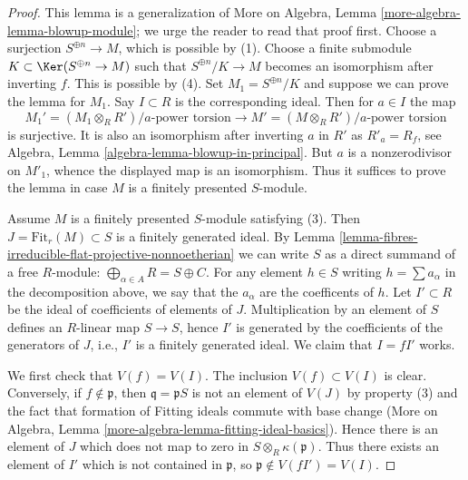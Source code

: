 \begin{proof}
This lemma is a generalization of
More on Algebra, Lemma \ref{more-algebra-lemma-blowup-module};
we urge the reader to read that proof first.
Choose a surjection $S^{\oplus n} \to M$, which is possible by (1).
Choose a finite submodule $K \subset \Ker(S^{\oplus n} \to M)$
such that $S^{\oplus n}/K \to M$ becomes an isomorphism after inverting $f$.
This is possible by (4). Set $M_1 = S^{\oplus n}/K$ and suppose we can
prove the lemma for $M_1$. Say $I \subset R$ is the corresponding ideal.
Then for $a \in I$ the map
$$
M_1' = (M_1 \otimes_R R')/a\text{-power torsion}
\longrightarrow
M' = (M \otimes_R R')/a\text{-power torsion}
$$
is surjective. It is also an isomorphism after inverting $a$ in $R'$
as $R'_a = R_f$, see Algebra, Lemma \ref{algebra-lemma-blowup-in-principal}.
But $a$ is a nonzerodivisor on $M'_1$, whence the displayed map is an
isomorphism. Thus it suffices to prove the lemma in case $M$ is a finitely
presented $S$-module.

\medskip\noindent
Assume $M$ is a finitely presented $S$-module satisfying (3).
Then $J = \text{Fit}_r(M) \subset S$ is a finitely generated ideal.
By Lemma \ref{lemma-fibres-irreducible-flat-projective-nonnoetherian}
we can write $S$ as a direct summand of a free
$R$-module: $\bigoplus_{\alpha \in A} R = S \oplus C$.
For any element $h \in S$ writing $h = \sum a_\alpha$ in the
decomposition above, we say that the $a_\alpha$ are the coefficents of $h$.
Let $I' \subset R$ be the ideal of coefficients
of elements of $J$. Multiplication by an element of $S$ defines
an $R$-linear map $S \to S$, hence $I'$ is generated by the coefficients
of the generators of $J$, i.e., $I'$ is a finitely generated ideal.
We claim that $I = fI'$ works.

\medskip\noindent
We first check that $V(f) = V(I)$. The inclusion $V(f) \subset V(I)$ is
clear. Conversely, if $f \not \in \mathfrak p$, then
$\mathfrak q =  \mathfrak p S$ is not an element of $V(J)$ by
property (3) and the fact that formation of Fitting ideals commute with
base change
(More on Algebra, Lemma \ref{more-algebra-lemma-fitting-ideal-basics}).
Hence there is an
element of $J$ which does not map to zero in $S \otimes_R \kappa(\mathfrak p)$.
Thus there exists an element of $I'$ which is not contained in
$\mathfrak p$, so $\mathfrak p \not \in V(fI') = V(I)$.


\end{proof}
